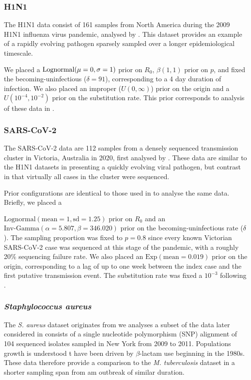 \documentclass{article}
\begin{document}
\begin{spacing}{1.5}
\subsubsection*{H1N1}
The H1N1 data consist of 161 samples from North America during the 2009 H1N1 influenza virus pandemic, analysed by \citet{hedge_2013_real-time}. This  dataset provides an example of a rapidly evolving pathogen sparsely sampled over a longer epidemiological timescale. 

We placed a $\textnormal{Lognormal}(\mu=0,\sigma=1)$ prior on $R_0$, $\beta(1,1)$ prior on $p$, and fixed the becoming-uninfectious ($\delta = 91$), corresponding to a 4 day duration of infection. We also placed an improper ($U(0,\infty)$) prior on the origin and a $U(10^{-4},10^{-2})$ prior on the substitution rate. This prior corresponds to analysis of these data in \citet{featherstone_decoding_2023}.

\subsubsection*{SARS-CoV-2}
The SARS-CoV-2 data are 112 samples from a densely sequenced transmission cluster in Victoria, Australia in 2020, first analysed by \citet{lane2021genomics}. These data are similar to the H1N1 datasets in presenting a quickly evolving viral pathogen, but contrast in that virtually all cases in the cluster were sequenced. 

Prior configurations are identical to those used in \citet{featherstone_decoding_2023} to analyse the same data. Briefly, we placed a 

$\textrm{Lognormal}(\textrm{mean}=1, \textrm{sd}=1.25)$ prior on $R_0$ and an $\textrm{Inv-Gamma}(\alpha=5.807, \beta=346.020)$ prior on the becoming-uninfectious rate ($\delta$).  The sampling proportion was fixed to $p=0.8$ since every known Victorian SARS-CoV-2 case was sequenced at this stage of the pandemic, with a roughly 20\% sequencing failure rate. We also placed an $\textrm{Exp}(\textrm{mean}=0.019)$ prior on the origin, corresponding to a lag of up to one week  between the index case and the first putative transmission event. The substitution rate was fixed a $10^{-3}$ following \citep{duchene_temporal_2020}.

\subsubsection*{\textit{Staphylococcus aureus}}
The \textit{S. aureus} dataset originates from \citet{uhlemann_molecular_2014} we analyses a subset of the data later considered in \citet{duchene_2016_genome} consists of a single nucleotide polymorphism (SNP) alignment of 104 sequenced isolates sampled in New York from 2009 to 2011. Populations growth is understood t have been driven by $\beta$-lactam use beginning in the 1980s. These data therefore provide a comparison to the \textit{M. tuberculosis} dataset in a shorter sampling span from am outbreak of similar duration.


\end{spacing}
\end{document}
